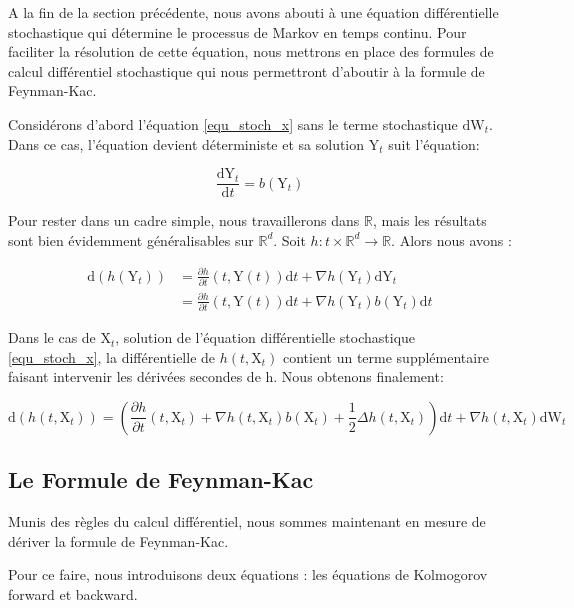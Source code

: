 \documentclass[11pt]{article}
\theoremstyle{definition}
\theoremstyle{remark}
\begin{document}
A la fin de la section précédente, nous avons abouti à une équation différentielle stochastique qui détermine le processus de Markov en temps continu. Pour faciliter la résolution de cette équation, nous  mettrons en place des formules de calcul différentiel stochastique qui nous permettront d'aboutir à la formule de Feynman-Kac. 

Considérons d'abord l’équation \eqref{equ_stoch_x} sans le terme stochastique $\mathrm{dW}_{t}$. Dans ce cas, l'équation devient déterministe et sa solution $\mathrm{Y}_t$ suit l'équation:

\begin{equation}
\frac{\mathrm{dY}_{t}}{\mathrm{d}t} = b(\mathrm{Y}_t) 
\end{equation}

Pour rester dans un cadre simple, nous travaillerons dans $\mathbb{R}$, mais les résultats sont bien évidemment généralisables sur $\mathbb{R}^d$. Soit $h: t \times \mathbb{R}^d \rightarrow \mathbb{R}$. Alors nous avons : 

\begin{align*}
\mathrm{d}(h(\mathrm{Y}_{t})) &= \frac{\partial h}{\partial t}(t,\mathrm{Y}(t)) \mathrm{d}t + \nabla h(\mathrm{Y}_{t}) \mathrm{dY}_{t} \\
&= \frac{\partial h}{\partial t}(t,\mathrm{Y}(t)) \mathrm{d}t + \nabla h(\mathrm{Y}_{t}) b(\mathrm{Y}_{t})\mathrm{d}t
\end{align*}

Dans le cas de $\mathrm{X}_{t}$, solution de l'équation différentielle stochastique \eqref{equ_stoch_x}, la différentielle de $h(t, \mathrm{X}_t)$ contient un terme supplémentaire faisant intervenir les dérivées secondes de h. Nous obtenons finalement:

\begin{equation}
\mathrm{d}(h(t,\mathrm{X}_t)) = ( \frac{\partial h}{\partial t}(t, \mathrm{X}_t) + \nabla h(t,\mathrm{X}_t) b(\mathrm{X}_t) + \frac{1}{2} \Delta h(t,\mathrm{X}_t) )\mathrm{d}t + \nabla h(t,\mathrm{X}_t) \mathrm{dW}_{t}
\end{equation}

\subsection{Le Formule de Feynman-Kac}

Munis des règles du calcul différentiel, nous sommes maintenant en mesure de dériver la formule de Feynman-Kac.

Pour ce faire, nous introduisons deux équations : les équations de Kolmogorov forward et backward.
\end{document}
